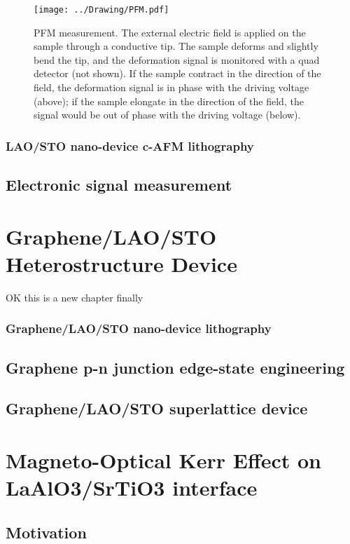 \documentclass[pdftex, sectionletters]{pittetd}    %
\begin{document}
\begin{figure}[h!]
	\centering
	\texttt{[image: ../Drawing/PFM.pdf]}
	\caption{PFM measurement. The external electric field is applied on the sample through a conductive tip. The sample deforms and slightly bend the tip, and the deformation signal is monitored with a quad detector (not shown). If the sample contract in the direction of the field, the deformation signal is in phase with the driving voltage (above); if the sample elongate in the direction of the field, the signal would be out of phase with the driving voltage (below).}
	\label{FIG:PFM}
\end{figure}

\subsection{LAO/STO nano-device c-AFM lithography}


\section{Electronic signal measurement}

\chapter{Graphene/LAO/STO Heterostructure Device}

OK this is a new chapter finally

\subsection{Graphene/LAO/STO nano-device lithography}

\section{Graphene p-n junction edge-state engineering}

\section{Graphene/LAO/STO superlattice device}

\chapter{Magneto-Optical Kerr Effect on LaAlO3/SrTiO3 interface}

\section{Motivation}
\end{document}
